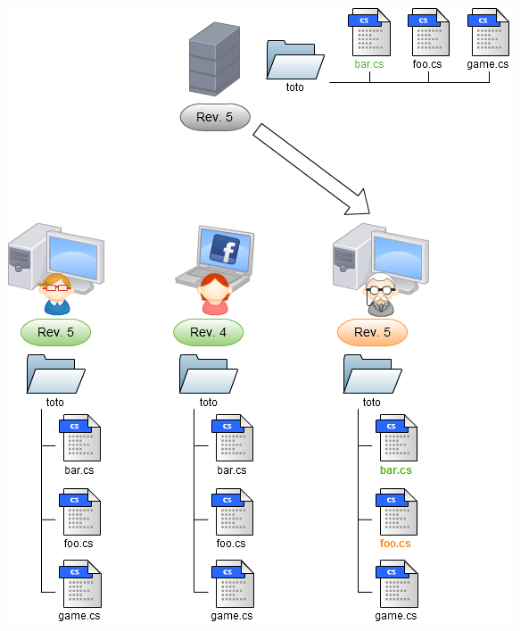 \begin{frame}
  \begin{center}
    \includegraphics[scale=0.3]{images/5-Update.png}
  \end{center}
\end{frame}

